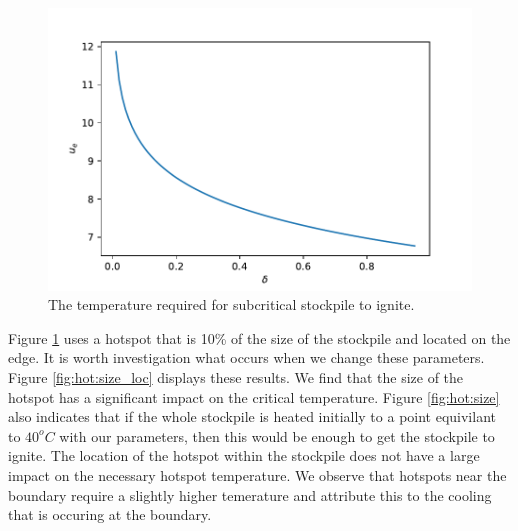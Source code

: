\begin{figure}[h!]
\centering
\includegraphics[width=\linewidth]{figures/NDA/Hotspot/delta1.pdf}  
\caption{The temperature required for subcritical stockpile to ignite.}
\label{fig:hot:delta1}
\end{figure} 

Figure \ref{fig:hot:delta1} uses a hotspot that is 10\% of the size of the stockpile and located on the edge. It is worth investigation what occurs when we change these parameters. Figure \ref{fig:hot:size_loc} displays these results. We find that the size of the hotspot has a significant impact on the critical temperature. Figure \ref{fig:hot:size} also indicates that if the whole stockpile is heated initially to a point equivilant to $40^oC$ with our parameters, then this would be enough to get the stockpile to ignite. The location of the hotspot within the stockpile does not have a large impact on the necessary hotspot temperature. We observe that hotspots near the boundary require a slightly higher temerature and attribute this to the cooling that is occuring at the boundary.\\

